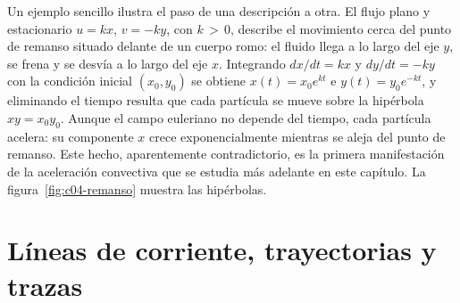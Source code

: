 \documentclass[10pt,openany]{book}
\begin{document}
\begin{minipage}{\linewidth}
%
\fi
\fi
\endgroup
\par\nopagebreak
{}
\end{minipage}
\par\vspace{\baselineskip}

Un ejemplo sencillo ilustra el paso de una descripción a otra. El flujo plano y estacionario \(u = kx\), \(v = -ky\), con \(k\,>\,0\), describe el movimiento cerca del punto de remanso situado delante de un cuerpo romo: el fluido llega a lo largo del eje \(y\), se frena y se desvía a lo largo del eje \(x\). Integrando \(dx/dt = kx\) y \(dy/dt = -ky\) con la condición inicial \((x_0, y_0)\) se obtiene \(x(t) = x_0 e^{kt}\) e \(y(t) = y_0 e^{-kt}\), y eliminando el tiempo resulta que cada partícula se mueve sobre la hipérbola \(xy = x_0 y_0\). Aunque el campo euleriano no depende del tiempo, cada partícula acelera: su componente \(x\) crece exponencialmente mientras se aleja del punto de remanso. Este hecho, aparentemente contradictorio, es la primera manifestación de la aceleración convectiva que se estudia más adelante en este capítulo. La figura~\ref{fig:c04-remanso} muestra las hipérbolas.

\section{Líneas de corriente, trayectorias y trazas}
\end{document}
